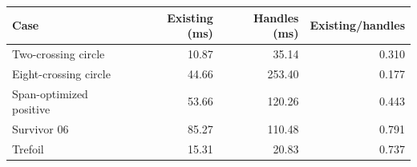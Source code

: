 \begin{center}
\begin{tabular}{lrrr}
\toprule
Case & Existing (ms) & Handles (ms) & Existing/handles \\
\midrule
Two-crossing circle & 10.87 & 35.14 & 0.310 \\
Eight-crossing circle & 44.66 & 253.40 & 0.177 \\
Span-optimized positive & 53.66 & 120.26 & 0.443 \\
Survivor 06 & 85.27 & 110.48 & 0.791 \\
Trefoil & 15.31 & 20.83 & 0.737 \\
\bottomrule
\end{tabular}
\end{center}
